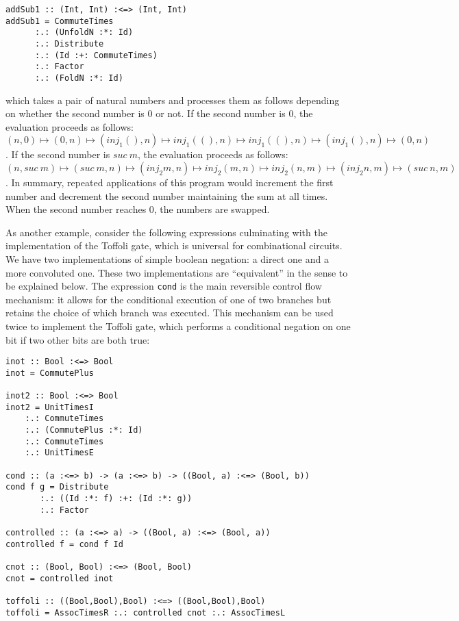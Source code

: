 \documentclass{entcs}
\begin{document}
{\footnotesize
\begin{verbatim}
addSub1 :: (Int, Int) :<=> (Int, Int)
addSub1 = CommuteTimes
      :.: (UnfoldN :*: Id)
      :.: Distribute
      :.: (Id :+: CommuteTimes)
      :.: Factor
      :.: (FoldN :*: Id)
\end{verbatim}}
%
\noindent which takes a pair of natural numbers and processes them as follows depending on
whether the second number is 0 or not. If the second number is 0, the evaluation
proceeds as follows:
$(n,0) \mapsto (0,n) \mapsto (\mathit{inj}_1(),n) \mapsto \mathit{inj}_1((),n)
\mapsto \mathit{inj}_1((),n) \mapsto (\mathit{inj}_1(),n) \mapsto (0,n)$. If the
second number is $\mathit{suc}~m$, the evaluation proceeds as follows:
$(n, \mathit{suc}~m) \mapsto (\mathit{suc}~m,n) \mapsto (\mathit{inj}_2m,n)
\mapsto \mathit{inj}_2(m,n) \mapsto \mathit{inj}_2(n,m) \mapsto
(\mathit{inj}_2n,m) \mapsto (\mathit{suc}~n,m)$. In summary, repeated
applications of this program would increment the first number and decrement the
second number maintaining the sum at all times. When the second number reaches
0, the numbers are swapped.

As another example, consider the following expressions culminating with the
implementation of the Toffoli gate, which is universal for combinational
circuits. We have two implementations of simple boolean negation: a direct one
and a more convoluted one. These two implementations are ``equivalent'' in the
sense to be explained below. The expression \verb|cond| is the main reversible
control flow mechanism: it allows for the conditional execution of one of two
branches but retains the choice of which branch was executed. This mechanism can
be used twice to implement the Toffoli gate, which performs a conditional
negation on one bit if two other bits are both true:

{\footnotesize
\begin{verbatim}
inot :: Bool :<=> Bool
inot = CommutePlus

inot2 :: Bool :<=> Bool
inot2 = UnitTimesI
    :.: CommuteTimes
    :.: (CommutePlus :*: Id)
    :.: CommuteTimes
    :.: UnitTimesE

cond :: (a :<=> b) -> (a :<=> b) -> ((Bool, a) :<=> (Bool, b))
cond f g = Distribute
       :.: ((Id :*: f) :+: (Id :*: g))
       :.: Factor

controlled :: (a :<=> a) -> ((Bool, a) :<=> (Bool, a))
controlled f = cond f Id

cnot :: (Bool, Bool) :<=> (Bool, Bool)
cnot = controlled inot

toffoli :: ((Bool,Bool),Bool) :<=> ((Bool,Bool),Bool)
toffoli = AssocTimesR :.: controlled cnot :.: AssocTimesL
\end{verbatim}}
\end{document}
